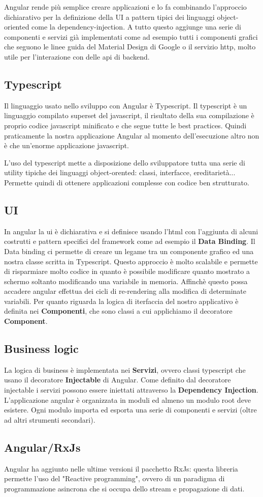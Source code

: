 Angular rende più semplice creare applicazioni e lo fa combinando l'approccio dichiarativo per la definizione della UI a pattern tipici dei linguaggi object-oriented come la dependency-injection.
A tutto questo aggiunge una serie di componenti e servizi già implementati come ad esempio tutti i componenti grafici che seguono le linee guida del Material Design di Google o il servizio http, molto utile per l'interazione con delle api di backend.

\subsection{Typescript}
Il linguaggio usato nello sviluppo con Angular è Typescript. Il typescript è un linguaggio compilato superset del javascript, il risultato della sua compilazione è proprio codice javascript minificato e che segue tutte le best practices.
Quindi praticamente la nostra applicazione Angular al momento dell'esecuzione altro non è che un'enorme applicazione javascript.

L'uso del typescript mette a disposizione dello sviluppatore tutta una serie di utility tipiche dei linguaggi object-orented: classi, interfacce, ereditarietà...
Permette quindi di ottenere applicazioni complesse con codice ben strutturato.

\subsection{UI}
In angular la ui è dichiarativa e si definisce usando l'html con l'aggiunta di alcuni costrutti e pattern specifici del framework come ad esempio il {\bfseries Data Binding}.
Il Data binding ci permette di creare un legame tra un componente grafico ed una nostra classe scritta in Typescript.
Questo approccio è molto scalabile e permette di risparmiare molto codice in quanto è possibile modificare quanto mostrato a schermo soltanto modificando una variabile in memoria.
Affinchè questo possa accadere angular effettua dei cicli di re-rendering alla modifica di determinate variabili.
Per quanto riguarda la logica di iterfaccia del nostro applicativo è definita nei {\bfseries Componenti}, che sono classi a cui applichiamo il decoratore {\bfseries Component}.

\subsection{Business logic}
La logica di business è implementata nei {\bfseries Servizi}, ovvero classi typescript che usano il decoratore {\bfseries Injectable} di Angular.
Come definito dal decoratore injectable i servizi possono essere iniettati attraverso la {\bfseries Dependency Injection}.
L'applicazione angular è organizzata in moduli ed almeno un modulo root deve esistere. Ogni modulo importa ed esporta una serie di componenti e servizi (oltre ad altri strumenti secondari).

\subsection{Angular/RxJs}
Angular ha aggiunto nelle ultime versioni il pacchetto RxJs: questa libreria permette l'uso del "Reactive programming", ovvero di un paradigma di programmazione asincrona che si occupa dello stream e propagazione di dati.